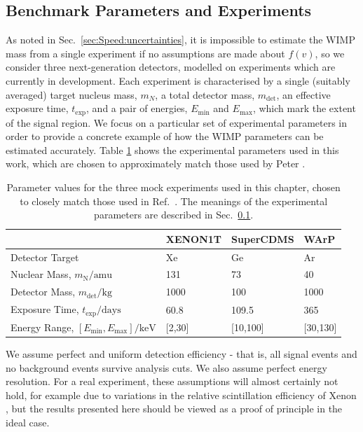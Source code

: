 \subsection{Benchmark Parameters and Experiments}
\label{sec:Speed:Experiments}
As noted in Sec.~\ref{sec:Speed:uncertainties}, it is impossible to estimate the WIMP mass from a single experiment if no assumptions are made about \(f(v)\), so we consider three next-generation detectors, modelled on experiments which are currently in development. Each experiment is characterised by a single (suitably averaged) target nucleus mass, \(m_N\), a total detector mass, \(m_\textrm{det}\), an effective exposure time, \(t_\textrm{exp}\), and a pair of energies, \(E_\textrm{min}\) and \(E_\textrm{max}\), which mark the extent of the signal region. We focus on a particular set of experimental parameters in order to provide a concrete example of how the WIMP parameters can be estimated accurately. Table \ref{tab:Speed:Expts} shows the experimental parameters used in this work, which are chosen to approximately match those used by Peter \cite{Peter:2011}.

\begin{table}[t]
  \begin{center}
    \begin{tabular}{lm{2cm}m{2.1cm}m{1.7cm}}
    \hline\hline
    & XENON1T \cite{Aprile:2009a} & SuperCDMS \cite{Bruch:2010} & WArP \cite{Szelc:2009} \\
\hline
Detector Target & Xe & Ge & Ar \\
Nuclear Mass, \(m_\textrm{N} / \textrm{amu}\) & 131 & 73 & 40 \\
Detector Mass, \(m_\textrm{det} / \textrm{kg} \) & 1000  & 100 & 1000 \\
Exposure Time, \(t_\textrm{exp} / \textrm{days} \) & 60.8  & 109.5 & 365\\
Energy Range, \(\left[E_\textrm{min},E_\textrm{max} \right] / \textrm{keV}\) & [2,30] & [10,100] & [30,130] \\
    \hline\hline
    \end{tabular}
  \end{center}
  \caption[Parameter values for the three mock experiments used in Chapter \ref{ch:Speed}]{Parameter values for the three mock experiments used in this chapter, chosen to closely match those used in Ref.\ \cite{Peter:2011}. The meanings of the experimental parameters are described in Sec.\ \ref{sec:Speed:Experiments}.}
\label{tab:Speed:Expts}
\end{table}
We assume perfect and uniform detection efficiency - that is, all signal events and no background events survive analysis cuts. We also assume perfect energy resolution. For a real experiment, these assumptions will almost certainly not hold, for example due to variations in the relative scintillation efficiency of Xenon \cite{Aprile:2009b}, but the results presented here should be viewed as a proof of principle in the ideal case.

